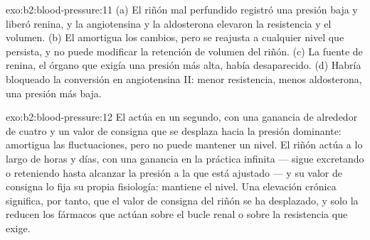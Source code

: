 \begin{solution}{exo:b2:blood-pressure:11}
(a) El riñón mal perfundido registró una presión baja y liberó renina, y
la angiotensina y la aldosterona elevaron la resistencia y el volumen.
(b) El  amortigua los cambios, pero se reajusta a cualquier
nivel que persista, y no puede modificar la retención de volumen del
riñón. (c) La fuente de renina, el órgano que exigía una presión más alta,
había desaparecido. (d) Habría bloqueado la conversión en angiotensina II:
menor resistencia, menos aldosterona, una presión más baja.
\end{solution}

\begin{solution}{exo:b2:blood-pressure:12}
El  actúa en un segundo, con una ganancia de alrededor de
cuatro y un valor de consigna que se desplaza hacia la presión dominante:
amortigua las fluctuaciones, pero no puede mantener un nivel. El riñón
actúa a lo largo de horas y días, con una ganancia en la práctica infinita
--- sigue excretando o reteniendo hasta alcanzar la presión a la que está
ajustado --- y su valor de consigna lo fija su propia fisiología: mantiene
el nivel. Una elevación crónica significa, por tanto, que el valor de
consigna del riñón se ha desplazado, y solo la reducen los fármacos que
actúan sobre el bucle renal o sobre la resistencia que exige.
\end{solution}

